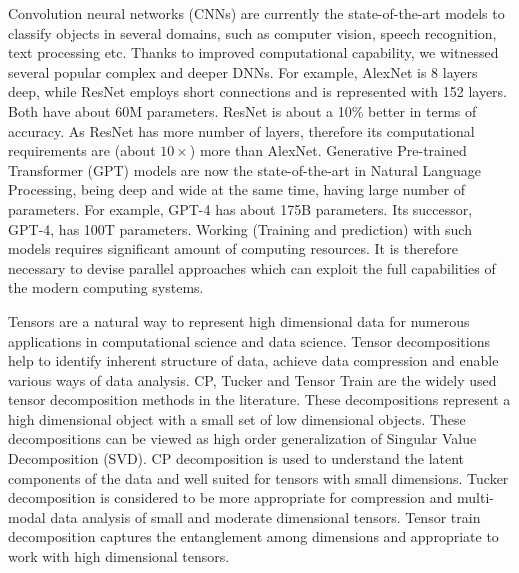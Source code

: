 Convolution neural networks  (CNNs) are currently the state-of-the-art models to classify objects in several domains, such as computer vision, speech recognition, text processing etc. Thanks to improved computational capability, we witnessed several popular complex and deeper DNNs. For example, AlexNet is 8 layers deep, while ResNet employs short connections and is represented with 152 layers. Both have about 60M parameters. ResNet is about a 10\% better in terms of accuracy. As  ResNet has more number of layers, therefore its computational requirements are (about $10\times$) more than AlexNet. Generative Pre-trained Transformer (GPT) models are now the state-of-the-art in Natural Language Processing, being deep and wide at the same time, having large number of parameters. For  example, GPT-4 has about 175B parameters. Its successor, GPT-4, has 100T parameters. Working (Training and prediction) with such models requires significant amount of computing resources. It is therefore necessary to devise parallel approaches which can exploit the full capabilities of the modern computing systems.    



Tensors are a natural way to represent high dimensional data for numerous applications in computational science and data science. Tensor decompositions help to identify inherent structure of data, achieve data compression and enable various ways of data analysis. CP, Tucker and Tensor Train are the widely used tensor decomposition methods in the literature. These decompositions represent a high dimensional object with a small set of low dimensional objects. These decompositions can be viewed as high order generalization of Singular Value Decomposition (SVD). CP decomposition is used to understand the latent components of the data and well suited for tensors with small dimensions. Tucker decomposition is considered to be more appropriate for compression and multi-modal data analysis of small and moderate dimensional tensors. Tensor train decomposition captures the entanglement among dimensions and appropriate to work with high dimensional tensors.


